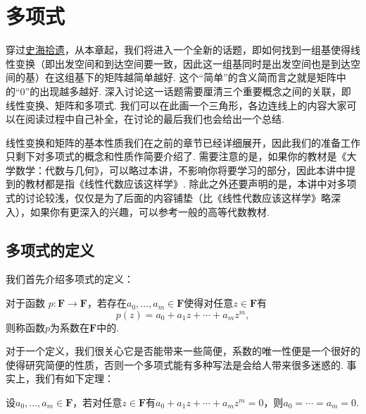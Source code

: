\chapter{多项式}

穿过\hyperref[chap:史海拾遗]{史海拾遗}，从本章起，我们将进入一个全新的话题，即如何找到一组基使得线性变换（即出发空间和到达空间要一致，因此这一组基同时是出发空间也是到达空间的基）在这组基下的矩阵越简单越好. 这个``简单''的含义简而言之就是矩阵中的``0''的出现越多越好. 深入讨论这一话题需要厘清三个重要概念之间的关联，即线性变换、矩阵和多项式. 我们可以在此画一个三角形，各边连线上的内容大家可以在阅读过程中自己补全，在讨论的最后我们也会给出一个总结.

\begin{figure}[H]
    \centering
\end{figure}

线性变换和矩阵的基本性质我们在之前的章节已经详细展开，因此我们的准备工作只剩下对多项式的概念和性质作简要介绍了. 需要注意的是，如果你的教材是《大学数学：代数与几何》，可以略过本讲，不影响你将要学习的部分，因此本讲中提到的教材都是指《线性代数应该这样学》. 除此之外还要声明的是，本讲中对多项式的讨论较浅，仅仅是为了后面的内容铺垫（比《线性代数应该这样学》略深入），如果你有更深入的兴趣，可以参考一般的高等代数教材.

\section{多项式的定义}

我们首先介绍多项式的定义：
\begin{definition}[多项式] 
    对于函数 $p:\mathbf{F}\to\mathbf{F}$，若存在$a_0,\ldots,a_m\in\mathbf{F}$使得对任意$z\in\mathbf{F}$有
    \begin{equation}\label{eq:17:多项式定义}
        p(z)=a_0+a_1z+\cdots+a_mz^m,
    \end{equation}
    则称函数$p$为系数在$\mathbf{F}$中的.
\end{definition}

对于一个定义，我们很关心它是否能带来一些简便，系数的唯一性便是一个很好的使得研究简便的性质，否则一个多项式能有多种写法是会给人带来很多迷惑的. 事实上，我们有如下定理：
\begin{theorem}
    设$a_0,\ldots,a_m\in\mathbf{F}$，若对任意$z\in\mathbf{F}$有$a_0+a_1z+\cdots+a_mz^m=0$，则$a_0=\cdots=a_m=0$.
\end{theorem}

